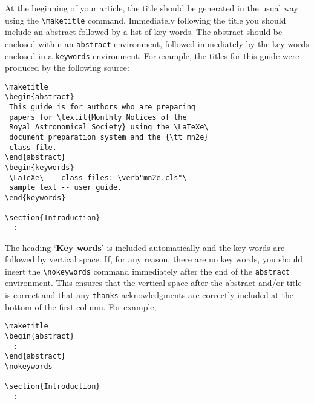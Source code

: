 \documentclass[useAMS,usenatbib]{mn2e}
\begin{document}
At the beginning of your article, the title should be generated in the
usual way using the \verb"\maketitle" command. Immediately following
the title you should include an abstract followed by a list of key
words. The abstract should be enclosed within an \verb"abstract"
environment, followed immediately by the key words enclosed in a
\verb"keywords" environment. For example, the titles for this guide
were produced by the following source:
%
\begin{verbatim}
\maketitle
\begin{abstract}
 This guide is for authors who are preparing
 papers for \textit{Monthly Notices of the
 Royal Astronomical Society} using the \LaTeXe\
 document preparation system and the {\tt mn2e}
 class file.
\end{abstract}
\begin{keywords}
 \LaTeXe\ -- class files: \verb"mn2e.cls"\ --
 sample text -- user guide.
\end{keywords}

\section{Introduction}
  :
\end{verbatim}
%
The heading `{\bf Key words}' is included automatically and the key
words are followed by vertical space. If, for any reason, there are no
key words, you should insert the \verb"\nokeywords" command immediately
after the end of the \verb"abstract" environment. This ensures that the
vertical space after the abstract and/or title is correct and that any
\verb"thanks" acknowledgments are correctly included at the bottom of
the first column. For example,
%
\begin{verbatim}
\maketitle
\begin{abstract}
  :
\end{abstract}
\nokeywords

\section{Introduction}
  :
\end{verbatim}
\end{document}
